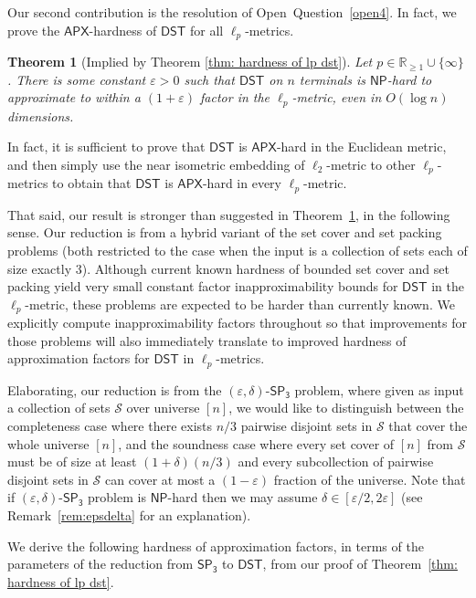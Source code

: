 \documentclass{article}\providecommand{\DeclareRedundantLanguages}[2]{}\usepackage[a4paper,margin=20mm]{geometry}
\newtheorem{theorem}{Theorem}\newtheorem{lemma}[theorem]{Lemma}\newtheorem{proposition}[theorem]{Proposition}\newtheorem{corollary}[theorem]{Corollary}\newtheorem{definition}[theorem]{Definition}\newtheorem{claim}[theorem]{Claim}\newtheorem{remark}[theorem]{Remark}\newtheorem{observation}[theorem]{Observation}\newtheorem{conjecture}[theorem]{Conjecture}\newtheorem{example}[theorem]{Example}
\newcommand{\1}{\textbf{1}}
\newcommand{\setpT}{$\mathsf{SP_3}$\xspace}
\newcommand{\dst}{$\mathsf{DST}$\xspace}
\newcommand{\np}{$\mathsf{NP}$\xspace}
\newcommand{\apx}{$\mathsf{APX}$\xspace}
\begin{document}
 
Our second contribution is the resolution of Open~Question~\ref{open4}. In fact, we prove the \apx-hardness of \dst for all $\ell_p$-metrics. 

\begin{theorem}[Implied by Theorem \ref{thm: hardness of lp dst}]
   \label{thm:introapx} Let $p\in \mathbb{R}_{\ge 1}\cup\{\infty\}$. There is some constant $\varepsilon>0$ such that \dst on $n$ terminals is \np-hard to approximate to within a $(1+\varepsilon)$ factor in the $\ell_p$-metric, even in $O(\log n)$ dimensions. 
\end{theorem}

In fact, it is sufficient to prove that \dst is \apx-hard in the Euclidean metric, and then simply use the near isometric embedding of $\ell_2$-metric to other $\ell_p$-metrics \cite{Racke_2006} to obtain that  \dst is \apx-hard in every  $\ell_p$-metric. 


That said, our result is stronger than suggested in Theorem~\ref{thm:introapx}, in the following sense. Our reduction is from a hybrid variant of the set cover and set packing problems (both restricted to the case when the input is a  collection of sets each of size exactly 3). Although current known hardness of bounded set cover and set packing yield very small constant factor inapproximability bounds for \dst in the $\ell_p$-metric, these problems are expected to be harder than currently known. We explicitly compute inapproximability factors throughout so that improvements for those problems will also immediately translate to improved hardness of approximation factors for \dst in $\ell_p$-metrics.

Elaborating, our reduction is from the $(\varepsilon,\delta)$-\setpT problem, where given as input a collection of sets $\mathcal{S}$ over universe $[n]$, we would like to distinguish between the completeness case where there exists $n/3$ pairwise disjoint sets in $\mathcal{S}$ that cover the whole universe $[n]$, and the soundness case where every set cover of $[n]$ from $\mathcal{S}$ must be of size at least $(1+\delta)(n/3)$ and every subcollection of pairwise disjoint sets in $\mathcal{S}$ can cover at most a $(1-\varepsilon)$ fraction of the universe. Note that if $(\varepsilon,\delta)$-\setpT problem is \np-hard then we may assume $\delta\in [\varepsilon/2,2\varepsilon]$ (see Remark~\ref{rem:epsdelta} for an explanation). 

We derive the following hardness of approximation factors, in terms of the parameters of the reduction from \setpT to \dst, from our proof of Theorem~\ref{thm: hardness of lp dst}.
\end{document}
